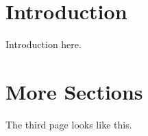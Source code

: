 \documentclass[12pt, a4paper]{article}
\newcommand{\cntext}[1]{\begin{CJK*}{UTF8}{bkai}#1\end{CJK*}}
\begin{document}
\thispagestyle{titlepage}

%
%

\begin{abstract}
Proposal abstract.

\cntext{中文摘要。}

\end{abstract}

%
%
\section{Introduction}

Introduction here.

\clearpage

\section{More Sections}

The third page looks like this. 

%
%
 \clearpage
\renewcommand\bibsection{\section*{REFERENCES}}
\setlength{\bibsep}{2pt}
%
\end{document}
